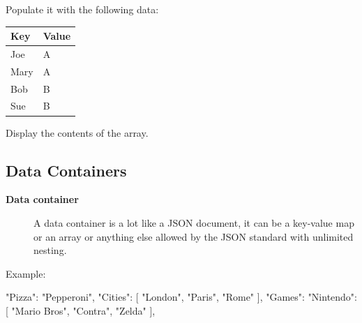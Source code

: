 \begin{aside}
\label{aside:exercise_16}

Populate it with the following data:

\begin{longtable}{|l|l|}
\hline
Key & Value\\
\hline
Joe & A\\
Mary & A\\
Bob & B\\
Sue & B\\
\hline
\end{longtable}

Display the contents of the array.

\end{aside}
\begin{codelisting}
\end{codelisting}





\subsection{Data Containers}

\begin{description}
\item[\textbf{Data container}] A data container is a lot like a JSON document, it can be a key-value
map or an array or anything else allowed by the JSON standard with
unlimited nesting.
\end{description}

Example:

\begin{code}
{
  "Pizza": "Pepperoni",
  "Cities": [
    "London",
    "Paris",
    "Rome"
  ],
  "Games": {
    "Nintendo": [
      "Mario Bros",
      "Contra",
      "Zelda"
    ],
  }
}
\end{code}

